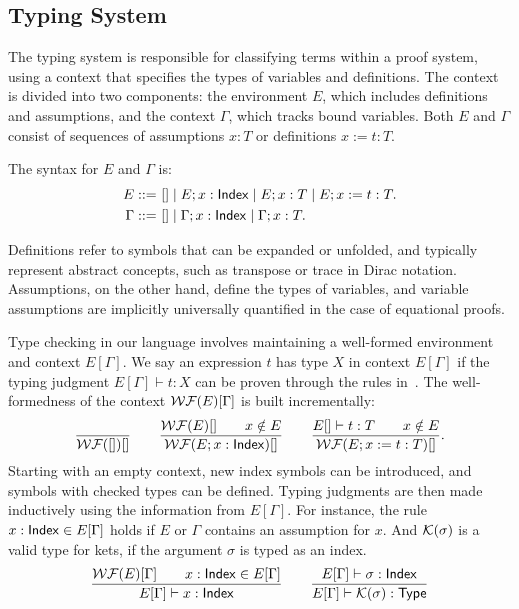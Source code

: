 \documentclass[runningheads]{llncs}
\begin{document}
\subsection{Typing System}


The typing system is responsible for classifying terms within a proof system, using a context that specifies the types of variables and definitions. The context is divided into two components: the environment \( E \), which includes definitions and assumptions, and the context \( \Gamma \), which tracks bound variables. Both \( E \) and \( \Gamma \) consist of sequences of assumptions \( x : T \) or definitions \( x := t : T \).
\begin{definition}
    The syntax for \( E \) and \( \Gamma \) is:
    \begin{align*}
        E ::= &\ [] \mid E; x : \mathsf{Index} \mid E; x : T \mid E; x := t : T. \\
        \Gamma ::= &\ [] \mid \Gamma; x : \mathsf{Index} \mid \Gamma; x : T.
    \end{align*}
\end{definition}
Definitions refer to symbols that can be expanded or unfolded, and typically represent abstract concepts, such as transpose or trace in Dirac notation. Assumptions, on the other hand, define the types of variables, and variable assumptions are implicitly universally quantified in the case of equational proofs.

Type checking in our language involves maintaining a well-formed environment and context \( E[\Gamma] \). We say an expression \( t \) has type \( X \) in context \( E[\Gamma] \) if the typing judgment \( E[\Gamma] \vdash t : X \) can be proven through the rules in~. The well-formedness of the context \( \mathcal{WF}(E)[\Gamma] \) is built incrementally:
\[
    \frac{}{\mathcal{WF}([])[]}
    \qquad
    \frac{\mathcal{WF}(E)[] \qquad x \notin E}{\mathcal{WF}(E; x : \mathsf{Index})[]}
    \qquad
    \frac{E[]\vdash t:T \qquad x \notin E}{\mathcal{WF}(E; x := t:T)[]}.
\]
Starting with an empty context, new index symbols can be introduced, and symbols with checked types can be defined. Typing judgments are then made inductively using the information from \( E[\Gamma] \). For instance, the rule \( x : \mathsf{Index} \in E[\Gamma] \) holds if \( E \) or \( \Gamma \) contains an assumption for \( x \).
And \(\mathcal{K}(\sigma)\) is a valid type for kets, if the argument $\sigma$ is typed as an index.
\begin{gather*}
    \frac{\mathcal{WF}(E)[\Gamma] \qquad x : \mathsf{Index} \in E[\Gamma]}{E[\Gamma] \vdash x : \mathsf{Index}}
    \qquad
    \frac{E[\Gamma] \vdash \sigma : \mathsf{Index}}{E[\Gamma] \vdash \mathcal{K}(\sigma) : \mathsf{Type}}
\end{gather*}
\end{document}
